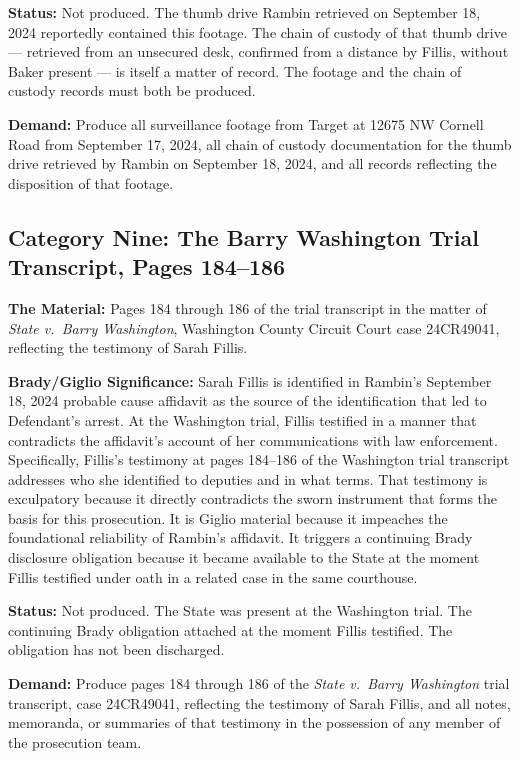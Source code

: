 \documentclass[12pt,letterpaper]{extarticle}
\begin{document}
\textbf{Status:} Not produced. The thumb drive Rambin retrieved on September 18,
2024 reportedly contained this footage. The chain of custody of that thumb drive ---
retrieved from an unsecured desk, confirmed from a distance by Fillis, without
Baker present --- is itself a matter of record. The footage and the chain of custody
records must both be produced.

\textbf{Demand:} Produce all surveillance footage from Target at 12675 NW Cornell
Road from September 17, 2024, all chain of custody documentation for the thumb
drive retrieved by Rambin on September 18, 2024, and all records reflecting the
disposition of that footage.

\subsection{Category Nine: The Barry Washington Trial Transcript, Pages 184--186}

\textbf{The Material:} Pages 184 through 186 of the trial transcript in the matter
of \textit{State v.\ Barry Washington}, Washington County Circuit Court case
24CR49041, reflecting the testimony of Sarah Fillis.

\textbf{Brady/Giglio Significance:} Sarah Fillis is identified in Rambin's
September 18, 2024 probable cause affidavit as the source of the identification
that led to Defendant's arrest. At the Washington trial, Fillis testified in a
manner that contradicts the affidavit's account of her communications with law
enforcement. Specifically, Fillis's testimony at pages 184--186 of the Washington
trial transcript addresses who she identified to deputies and in what terms.
That testimony is exculpatory because it directly contradicts the sworn instrument
that forms the basis for this prosecution. It is Giglio material because it
impeaches the foundational reliability of Rambin's affidavit. It triggers a
continuing Brady disclosure obligation because it became available to the State at
the moment Fillis testified under oath in a related case in the same courthouse.

\textbf{Status:} Not produced. The State was present at the Washington trial. The
continuing Brady obligation attached at the moment Fillis testified. The obligation
has not been discharged.

\textbf{Demand:} Produce pages 184 through 186 of the \textit{State v.\ Barry
Washington} trial transcript, case 24CR49041, reflecting the testimony of Sarah
Fillis, and all notes, memoranda, or summaries of that testimony in the possession
of any member of the prosecution team.
\end{document}
